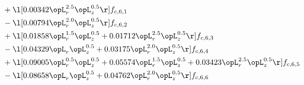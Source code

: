 \begin{alignat}{2}
& + \l[  0.00342 \opL_r^{2.5} \opL_z^{0.5}  \r] f_{c,6,1} \nonumber \\ 
& - \l[  0.00794 \opL_r^{2.0} \opL_z^{0.5}  \r] f_{c,6,2} \nonumber \\ 
& + \l[  0.01858 \opL_r^{1.5} \opL_z^{0.5} +  0.01712 \opL_r^{2.5} \opL_z^{0.5}  \r] f_{c,6,3} \nonumber \\ 
& - \l[  0.04329 \opL_r \opL_z^{0.5} +  0.03175 \opL_r^{2.0} \opL_z^{0.5}  \r] f_{c,6,4} \nonumber \\ 
& + \l[  0.09005 \opL_r^{0.5} \opL_z^{0.5} +  0.05574 \opL_r^{1.5} \opL_z^{0.5} +  0.03423 \opL_r^{2.5} \opL_z^{0.5}  \r] f_{c,6,5} \nonumber \\ 
& - \l[  0.08658 \opL_r \opL_z^{0.5} +  0.04762 \opL_r^{2.0} \opL_z^{0.5}  \r] f_{c,6,6} \nonumber \\ 
\end{alignat} 


